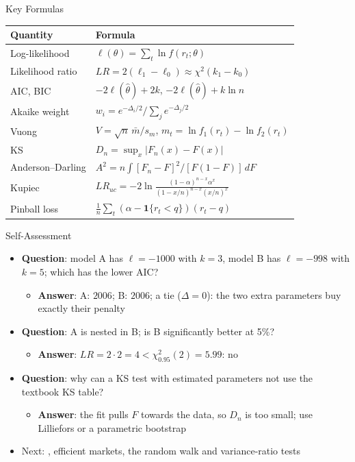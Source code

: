 \begin{frame}{Key Formulas}
\itemsize{\small}
{\renewcommand{\arraystretch}{1.4}\begin{center}
\footnotesize
\begin{tabular}{ll}
\toprule
\textbf{Quantity} & \textbf{Formula} \\
\midrule
Log-likelihood & $\ell(\theta) = \sum_t \ln f(r_t; \theta)$ \\
Likelihood ratio & $LR = 2(\ell_1 - \ell_0) \approx \chi^2(k_1 - k_0)$ \\
AIC, BIC & $-2\ell(\hat\theta) + 2k$, \quad $-2\ell(\hat\theta) + k\ln n$ \\
Akaike weight & $w_i = e^{-\Delta_i/2} / \sum_j e^{-\Delta_j/2}$ \\
Vuong & $V = \sqrt{n}\,\bar m / s_m$, \quad $m_t = \ln f_1(r_t) - \ln f_2(r_t)$ \\
KS & $D_n = \sup_x |F_n(x) - F(x)|$ \\
Anderson--Darling & $A^2 = n\int [F_n - F]^2 / [F(1 - F)]\, dF$ \\
Kupiec & $LR_{uc} = -2\ln\frac{(1-\alpha)^{n - x}\alpha^x}{(1 - x/n)^{n - x}(x/n)^x}$ \\
Pinball loss & $\frac{1}{n}\sum_t (\alpha - \mathbf{1}\{r_t < q\})(r_t - q)$ \\
\bottomrule
\end{tabular}
\end{center}
}
\end{frame}

\begin{frame}{Self-Assessment}
\itemsize{\small}
\begin{itemize}
    \item \textbf{Question}: model A has $\ell = -1000$ with $k = 3$, model B has $\ell = -998$ with $k = 5$; which has the lower AIC?
    \begin{itemize}
        \item \textbf{Answer}: A: $2006$; B: $2006$; a tie ($\Delta = 0$): the two extra parameters buy exactly their penalty
    \end{itemize}
    \item \textbf{Question}: A is nested in B; is B significantly better at 5\%?
    \begin{itemize}
        \item \textbf{Answer}: $LR = 2 \cdot 2 = 4 < \chi^2_{0.95}(2) = 5.99$: no
    \end{itemize}
    \item \textbf{Question}: why can a KS test with estimated parameters not use the textbook KS table?
    \begin{itemize}
        \item \textbf{Answer}: the fit pulls $F$ towards the data, so $D_n$ is too small; use Lilliefors or a parametric bootstrap
    \end{itemize}
    \item Next: , efficient markets, the random walk and variance-ratio tests
\end{itemize}
\end{frame}


